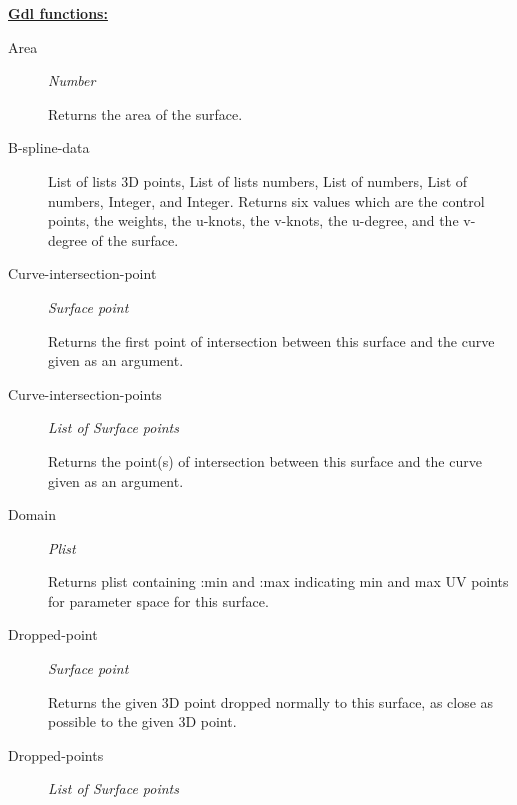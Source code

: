 \documentclass [11pt]{book}
\begin{document}
\begin{itemize}
\begin{description}
\end{description}






\textbf{
\underline{Gdl functions:}}

\begin{description}

\item [Area]
\emph{Number}

 Returns the area of the surface.




\item [B-spline-data]

List of lists 3D points, List of lists numbers, List of numbers,
List of numbers, Integer, and Integer.
Returns six values which are the control points, the weights, the u-knots,
the v-knots, the u-degree, and the v-degree of the surface.




\item [Curve-intersection-point]
\emph{Surface point}

 Returns the first point of intersection between
this surface and the curve given as an argument.




\item [Curve-intersection-points]
\emph{List of Surface points}

 Returns the point(s) of intersection between
this surface and the curve given as an argument.




\item [Domain]
\emph{Plist}

 Returns plist containing :min and :max indicating min and max UV points
for parameter space for this surface.




\item [Dropped-point]
\emph{Surface point}

 Returns the given 3D point dropped normally to this
surface, as close as possible to the given 3D point.




\item [Dropped-points]
\emph{List of Surface points}


\end{description}
\end{itemize}
\end{document}
